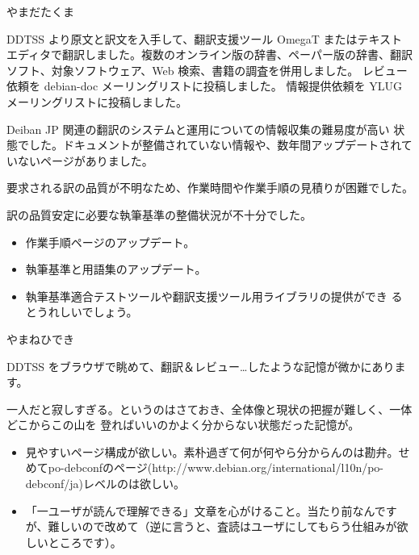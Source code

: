 \begin{prework}{やまだたくま}


DDTSS より原文と訳文を入手して、翻訳支援ツール OmegaT またはテキスト
エディタで翻訳しました。複数のオンライン版の辞書、ペーパー版の辞書、翻訳
ソフト、対象ソフトウェア、Web 検索、書籍の調査を併用しました。
レビュー依頼を debian-doc メーリングリストに投稿しました。
情報提供依頼を YLUG メーリングリストに投稿しました。


Deiban JP 関連の翻訳のシステムと運用についての情報収集の難易度が高い
状態でした。ドキュメントが整備されていない情報や、数年間アップデートされて
いないページがありました。

要求される訳の品質が不明なため、作業時間や作業手順の見積りが困難でした。

訳の品質安定に必要な執筆基準の整備状況が不十分でした。


\begin{itemize}
 \item 作業手順ページのアップデート。

 \item 執筆基準と用語集のアップデート。

 \item 執筆基準適合テストツールや翻訳支援ツール用ライブラリの提供ができ
       るとうれしいでしょう。
\end{itemize}

\end{prework}

\begin{prework}{やまねひでき}


DDTSS をブラウザで眺めて、翻訳＆レビュー…したような記憶が微かにあります。


一人だと寂しすぎる。というのはさておき、全体像と現状の把握が難しく、一体どこからこの山を
登ればいいのかよく分からない状態だった記憶が。


\begin{itemize}
 \item 見やすいページ構成が欲しい。素朴過ぎて何が何やら分からんのは勘弁。せめてpo-debconfのページ(http://www.debian.org/international/l10n/po-debconf/ja)レベルのは欲しい。
 \item 「一ユーザが読んで理解できる」文章を心がけること。当たり前なんですが、難しいので改めて（逆に言うと、査読はユーザにしてもらう仕組みが欲しいところです）。
\end{itemize}

\end{prework}

